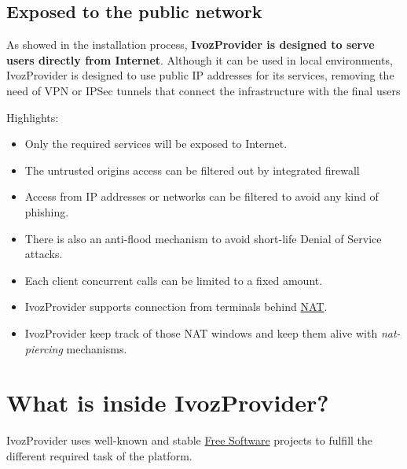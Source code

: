 \documentclass[letterpaper,10pt,english]{sphinxmanual}
\begin{document}
\subsection{Exposed to the public network}
\label{basic_concepts/intro/what_is_ivozprovider:exposed-to-the-public-network}\label{basic_concepts/intro/what_is_ivozprovider:exposed}
As showed in the installation process, \textbf{IvozProvider is designed to serve
users directly from Internet}. Although it can be used in local
environments, IvozProvider is designed to use public IP addresses for its
services, removing the need of VPN or IPSec tunnels that connect the
infrastructure with the final users

Highlights:
\begin{itemize}
\item {} 
Only the required services will be exposed to Internet.

\item {} 
The untrusted origins access can be filtered out by integrated firewall

\item {} 
Access from IP addresses or networks can be filtered to avoid any kind of
phishing.

\item {} 
There is also an anti-flood mechanism to avoid short-life Denial of
Service attacks.

\item {} 
Each client concurrent calls can be limited to a fixed amount.

\item {} 
IvozProvider supports connection from terminals behind
\href{https://en.wikipedia.org/wiki/Network\_address\_translation}{NAT}.

\item {} 
IvozProvider keep track of those NAT windows and keep them alive with
\emph{nat-piercing} mechanisms.

\end{itemize}


\section{What is inside IvozProvider?}
\label{basic_concepts/intro/what_is_inside::doc}\label{basic_concepts/intro/what_is_inside:what-is-inside-ivozprovider}
IvozProvider uses well-known and stable \href{https://www.gnu.org/philosophy/free-sw.en.html}{Free Software} projects to fulfill
the different required task of the platform.
\end{document}

